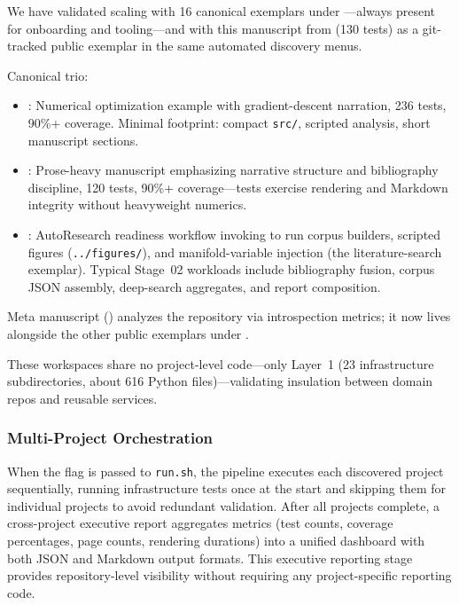 \documentclass[
]{article}
\providecommand{\tightlist}{%
  \setlength{\itemsep}{0pt}\setlength{\parskip}{0pt}}
\begin{document}
We have validated scaling with 16 canonical exemplars under
---always present for onboarding and
tooling---and with this manuscript from
 (130 tests) as a
git-tracked public exemplar in the same automated discovery menus.

Canonical trio:

\begin{itemize}
\tightlist
\item
  \textbf{}: Numerical optimization
  example with gradient-descent narration, 236 tests, 90\%+ coverage.
  Minimal footprint: compact \texttt{src/}, scripted analysis, short
  manuscript sections.
\item
  \textbf{}: Prose-heavy manuscript
  emphasizing narrative structure and bibliography discipline, 120
  tests, 90\%+ coverage---tests exercise rendering and Markdown
  integrity without heavyweight numerics.
\item
  \textbf{}: AutoResearch
  readiness workflow invoking
   to run
  corpus builders, scripted figures (\texttt{../figures/}), and
  manifold-variable injection (the literature-search exemplar). Typical
  Stage~02 workloads include bibliography fusion, corpus JSON assembly,
  deep-search aggregates, and report composition.
\end{itemize}

Meta manuscript
(\textbf{}) analyzes the
repository via  introspection metrics;
it now lives alongside the other public exemplars under
.

These workspaces share no project-level code---only Layer~1 (23
infrastructure subdirectories, about 616 Python
files)---validating insulation between domain repos and reusable
services.

\subsubsection{Multi-Project
Orchestration}\label{multi-project-orchestration}

When the  flag is passed to \texttt{run.sh},
the pipeline executes each discovered project sequentially, running
infrastructure tests once at the start and skipping them for individual
projects to avoid redundant validation. After all projects complete, a
cross-project executive report aggregates metrics (test counts, coverage
percentages, page counts, rendering durations) into a unified dashboard
with both JSON and Markdown output formats. This executive reporting
stage provides repository-level visibility without requiring any
project-specific reporting code.
\end{document}
